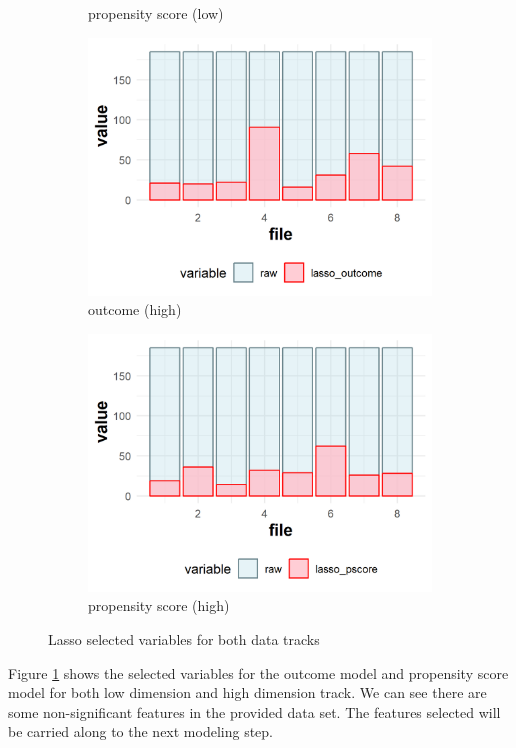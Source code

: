 \documentclass[11pt, oneside]{article}
\begin{document}
\begin{figure}[h]
\begin{subfigure}{0.24\textwidth}
    \caption{propensity score (low)}
  \end{subfigure}
  \begin{subfigure}{0.24\textwidth}
    \includegraphics[width=\textwidth]{../plot/high_lasso_outcome.png}
    \caption{outcome (high)}
  \end{subfigure}
  \begin{subfigure}{0.24\textwidth}
    \includegraphics[width=\textwidth]{../plot/high_lasso_pscore.png}
    \caption{propensity score (high)}
  \end{subfigure}
 \caption{Lasso selected variables for both data tracks} 
 \label{fig:lasso}
\end{figure}
Figure \ref{fig:lasso} shows the selected variables for the outcome model and propensity score model for both low dimension and high dimension track. We can see there are some non-significant features in the provided data set. The features selected will be carried along to the next modeling step.
\end{document}
